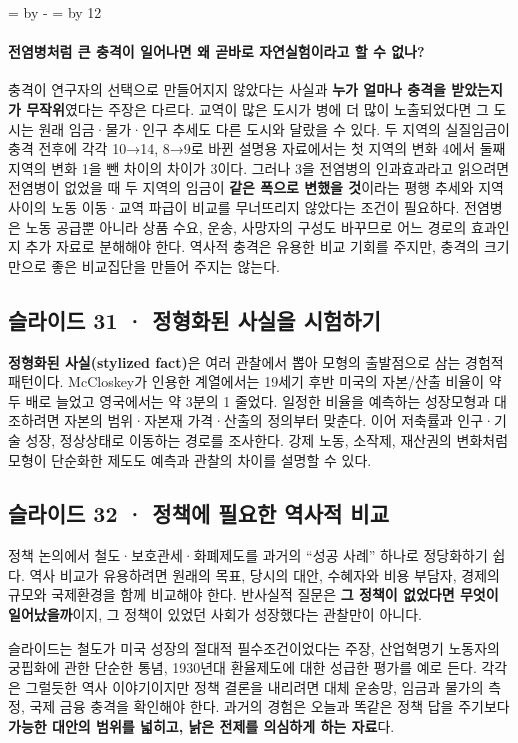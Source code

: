 \documentclass[10pt,a4paper]{article}
\newcommand{\ReserveQuestionSpace}{%
  \par\begingroup
  \dimen0=\pagegoal \advance\dimen0 by -\pagetotal
  \dimen2=\baselineskip \multiply\dimen2 by 12
  \ifdim\dimen0<\dimen2 \newpage\fi
  \endgroup}
\begin{document}
\ReserveQuestionSpace
\paragraph{전염병처럼 큰 충격이 일어나면 왜 곧바로 자연실험이라고 할 수 없나?}
충격이 연구자의 선택으로 만들어지지 않았다는 사실과 \textbf{누가 얼마나 충격을 받았는지가 무작위}였다는 주장은 다르다. 교역이 많은 도시가 병에 더 많이 노출되었다면 그 도시는 원래 임금·물가·인구 추세도 다른 도시와 달랐을 수 있다. 두 지역의 실질임금이 충격 전후에 각각 10→14, 8→9로 바뀐 설명용 자료에서는 첫 지역의 변화 4에서 둘째 지역의 변화 1을 뺀 차이의 차이가 3이다. 그러나 3을 전염병의 인과효과라고 읽으려면 전염병이 없었을 때 두 지역의 임금이 \textbf{같은 폭으로 변했을 것}이라는 평행 추세와 지역 사이의 노동 이동·교역 파급이 비교를 무너뜨리지 않았다는 조건이 필요하다. 전염병은 노동 공급뿐 아니라 상품 수요, 운송, 사망자의 구성도 바꾸므로 어느 경로의 효과인지 추가 자료로 분해해야 한다. 역사적 충격은 유용한 비교 기회를 주지만, 충격의 크기만으로 좋은 비교집단을 만들어 주지는 않는다.\par

\subsection{슬라이드 31 · 정형화된 사실을 시험하기}
\textbf{정형화된 사실(stylized fact)}은 여러 관찰에서 뽑아 모형의 출발점으로 삼는 경험적 패턴이다. McCloskey가 인용한 계열에서는 19세기 후반 미국의 자본/산출 비율이 약 두 배로 늘었고 영국에서는 약 3분의 1 줄었다. 일정한 비율을 예측하는 성장모형과 대조하려면 자본의 범위·자본재 가격·산출의 정의부터 맞춘다. 이어 저축률과 인구·기술 성장, 정상상태로 이동하는 경로를 조사한다. 강제 노동, 소작제, 재산권의 변화처럼 모형이 단순화한 제도도 예측과 관찰의 차이를 설명할 수 있다.\par

\subsection{슬라이드 32 · 정책에 필요한 역사적 비교}
정책 논의에서 철도·보호관세·화폐제도를 과거의 “성공 사례” 하나로 정당화하기 쉽다. 역사 비교가 유용하려면 원래의 목표, 당시의 대안, 수혜자와 비용 부담자, 경제의 규모와 국제환경을 함께 비교해야 한다. 반사실적 질문은 \textbf{그 정책이 없었다면 무엇이 일어났을까}이지, 그 정책이 있었던 사회가 성장했다는 관찰만이 아니다.\par

슬라이드는 철도가 미국 성장의 절대적 필수조건이었다는 주장, 산업혁명기 노동자의 궁핍화에 관한 단순한 통념, 1930년대 환율제도에 대한 성급한 평가를 예로 든다. 각각은 그럴듯한 역사 이야기이지만 정책 결론을 내리려면 대체 운송망, 임금과 물가의 측정, 국제 금융 충격을 확인해야 한다. 과거의 경험은 오늘과 똑같은 정책 답을 주기보다 \textbf{가능한 대안의 범위를 넓히고, 낡은 전제를 의심하게 하는 자료}다.\par
\end{document}
